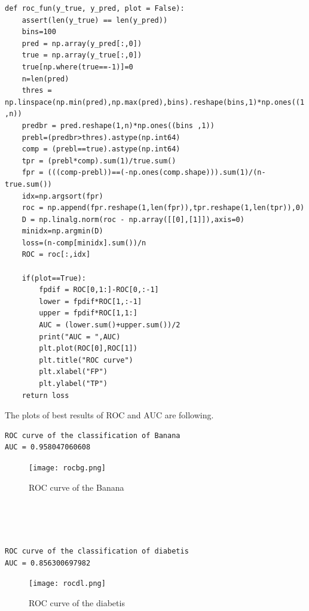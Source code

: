 \documentclass[a4paper,11pt]{article}
\begin{document}
\begin{verbatim}
def roc_fun(y_true, y_pred, plot = False):
    assert(len(y_true) == len(y_pred))
    bins=100
    pred = np.array(y_pred[:,0])
    true = np.array(y_true[:,0])
    true[np.where(true==-1)]=0
    n=len(pred)
    thres = np.linspace(np.min(pred),np.max(pred),bins).reshape(bins,1)*np.ones((1 ,n))
    predbr = pred.reshape(1,n)*np.ones((bins ,1))
    prebl=(predbr>thres).astype(np.int64)
    comp = (prebl==true).astype(np.int64)
    tpr = (prebl*comp).sum(1)/true.sum()
    fpr = (((comp-prebl))==(-np.ones(comp.shape))).sum(1)/(n-true.sum())
    idx=np.argsort(fpr)
    roc = np.append(fpr.reshape(1,len(fpr)),tpr.reshape(1,len(tpr)),0)
    D = np.linalg.norm(roc - np.array([[0],[1]]),axis=0)
    minidx=np.argmin(D)
    loss=(n-comp[minidx].sum())/n
    ROC = roc[:,idx]
    
    if(plot==True):
        fpdif = ROC[0,1:]-ROC[0,:-1]
        lower = fpdif*ROC[1,:-1]
        upper = fpdif*ROC[1,1:]
        AUC = (lower.sum()+upper.sum())/2
        print("AUC = ",AUC)
        plt.plot(ROC[0],ROC[1])
        plt.title("ROC curve")
        plt.xlabel("FP")
        plt.ylabel("TP")
    return loss 
\end{verbatim}

The plots of best results of ROC and AUC are following.

\begin{verbatim}
ROC curve of the classification of Banana 
AUC = 0.958047060608
\end{verbatim}

\begin{figure}[htbp]
 \centering 
  \texttt{[image: rocbg.png]}\\
    \caption{ROC curve of the Banana}
\end{figure}

\begin{verbatim}




\end{verbatim}

\begin{verbatim}
ROC curve of the classification of diabetis 
AUC = 0.856300697982
\end{verbatim}
\begin{figure}[htbp]
 \centering 
  \texttt{[image: rocdl.png]}\\
    \caption{ROC curve of the diabetis}
\end{figure}

\begin{verbatim}


\end{verbatim}
\end{document}
